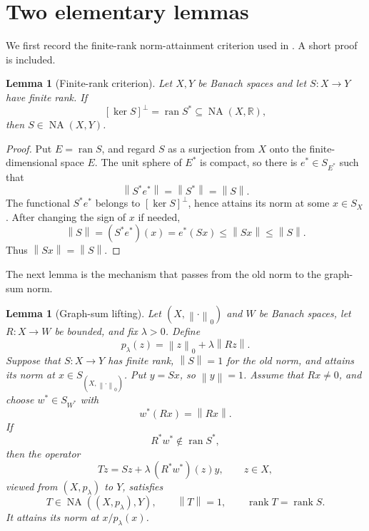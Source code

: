 \documentclass[11pt]{article}
\newtheorem{lemma}[theorem]{Lemma}
\theoremstyle{definition}
\newcommand{\NA}{\operatorname{NA}}
\newcommand{\ran}{\operatorname{ran}}
\newcommand{\rank}{\operatorname{rank}}
\newcommand{\R}{\mathbb R}
\newcommand{\norm}[1]{\left\lVert #1\right\rVert}
\begin{document}
\section{Two elementary lemmas}

We first record the finite-rank norm-attainment criterion used in
\cite[Corollary 2.6]{KLMW}.  A short proof is included.

\begin{lemma}[Finite-rank criterion]\label{lem:finite-rank-criterion}
Let \(X,Y\) be Banach spaces and let \(S:X\to Y\) have finite rank.  If
\[
             [\ker S]^\perp=\ran S^*\subseteq \NA(X,\R),
\]
then \(S\in\NA(X,Y)\).
\end{lemma}

\begin{proof}
Put \(E=\ran S\), and regard \(S\) as a surjection from \(X\) onto the
finite-dimensional space \(E\).  The unit sphere of \(E^*\) is compact, so
there is \(e^*\in S_{E^*}\) such that
\[
             \norm{S^*e^*}=\norm{S^*}=\norm{S}.
\]
The functional \(S^*e^*\) belongs to \([\ker S]^\perp\), hence attains its
norm at some \(x\in S_X\).  After changing the sign of \(x\) if needed,
\[
  \norm{S}
  =(S^*e^*)(x)
  =e^*(Sx)
  \leq \norm{Sx}
  \leq \norm{S}.
\]
Thus \(\norm{Sx}=\norm{S}\).
\end{proof}

The next lemma is the mechanism that passes from the old norm to the graph-sum
norm.

\begin{lemma}[Graph-sum lifting]\label{lem:graph-sum}
Let \((X,\norm{\cdot}_0)\) and \(W\) be Banach spaces, let
\(R:X\to W\) be bounded, and fix \(\lambda>0\).  Define
\[
          p_\lambda(z)=\norm{z}_0+\lambda\norm{Rz}.
\]
Suppose that \(S:X\to Y\) has finite rank, \(\norm{S}=1\) for the old norm,
and attains its norm at \(x\in S_{(X,\norm{\cdot}_0)}\).  Put \(y=Sx\), so
\(\norm{y}=1\).  Assume that \(Rx\neq0\), and choose
\(w^*\in S_{W^*}\) with
\[
                 w^*(Rx)=\norm{Rx}.
\]
If
\begin{equation}\label{eq:outside-range}
                 R^*w^*\notin\ran S^*,
\end{equation}
then the operator
\begin{equation}\label{eq:T-general}
        Tz=Sz+\lambda\,(R^*w^*)(z)y,
        \qquad z\in X,
\end{equation}
viewed from \((X,p_\lambda)\) to \(Y\), satisfies
\[
          T\in\NA((X,p_\lambda),Y),
          \qquad \norm{T}=1,
          \qquad \rank T=\rank S.
\]
It attains its norm at \(x/p_\lambda(x)\).
\end{lemma}
\end{document}
